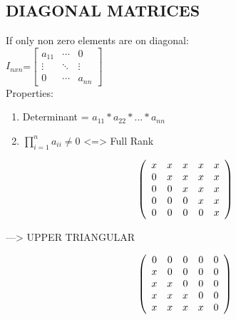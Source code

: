 \documentclass[]{article}
\providecommand{\tightlist}{%
  \setlength{\itemsep}{0pt}\setlength{\parskip}{0pt}}
\begin{document}
\subsection{\texorpdfstring{DIAGONAL MATRICES\\
}{DIAGONAL MATRICES }}\label{diagonal-matrices}

If only non zero elements are on diagonal:\\

\(I_{nxn}\)=\(\begin{bmatrix} a_{11} & \cdots & 0 \\ \vdots & \ddots & \vdots \\ 0 & \cdots & a_{nn} \end{bmatrix}\)\\
 Properties:

\begin{enumerate}
\def\labelenumi{\alph{enumi})}
\tightlist
\item
  Determinant = \(a_{11}*a_{22}*...*a_{nn}\)\\
\item
  \(\prod_{i=1}^{n}a_{ii} \neq 0\) \textless{}=\textgreater{} Full
  Rank\\
\end{enumerate}

\begin{equation}
  \left(
    \begin{array}{*5{c}}
     x & x & x & x & x \\
     0 & x & x & x & x \\
     0 &  0 & x & x & x \\
     0 &  0 &  0 & x & x \\
     0 &  0 &  0 &  0 & x \\
  \end{array}\right)
\end{equation}

---\textgreater{} UPPER TRIANGULAR

\begin{equation}
  \left(
    \begin{array}{*5{c}}
     0 & 0 & 0 & 0 & 0 \\
     x & 0 & 0 & 0 & 0 \\
     x &  x & 0 & 0 & 0 \\
     x &  x &  x & 0 & 0 \\
     x &  x &  x &  x & 0 \\
  \end{array}\right)
\end{equation}
\end{document}
